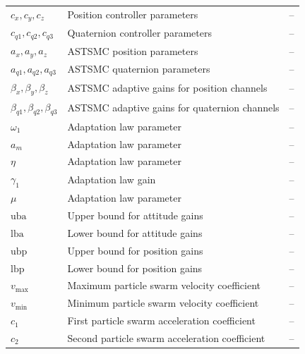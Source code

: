 \documentclass[12pt,a4paper]{report}
\begin{document}
\begin{longtable}{p{3cm} p{9cm} p{2.5cm}}
$c_x, c_y, c_z$ & Position controller parameters & -- \\
$c_{q1}, c_{q2}, c_{q3}$ & Quaternion controller parameters & -- \\

$a_x, a_y, a_z$ & ASTSMC position parameters & -- \\
$a_{q1}, a_{q2}, a_{q3}$ & ASTSMC quaternion parameters & -- \\

$\beta_x, \beta_y, \beta_z$ & ASTSMC adaptive gains for position channels & -- \\
$\beta_{q1}, \beta_{q2}, \beta_{q3}$ & ASTSMC adaptive gains for quaternion channels & -- \\

$\omega_1$ & Adaptation law parameter & -- \\
$a_m$ & Adaptation law parameter & -- \\
$\eta$ & Adaptation law parameter & -- \\
$\gamma_1$ & Adaptation law gain & -- \\
$\mu$ & Adaptation law parameter & -- \\

$\mathrm{uba}$ & Upper bound for attitude gains & -- \\
$\mathrm{lba}$ & Lower bound for attitude gains & -- \\
$\mathrm{ubp}$ & Upper bound for position gains & -- \\
$\mathrm{lbp}$ & Lower bound for position gains & -- \\
$v_{\max}$ & Maximum particle swarm velocity coefficient & -- \\
$v_{\min}$ & Minimum particle swarm velocity coefficient & -- \\
$c_1$ & First particle swarm acceleration coefficient & -- \\
$c_2$ & Second particle swarm acceleration coefficient & -- \\
\end{longtable}
\end{document}
